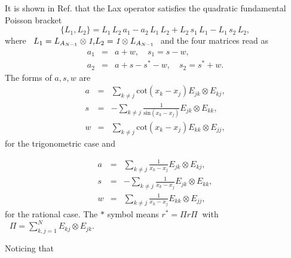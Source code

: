 \documentclass[a4paper,12pt]{article}
\begin{document}
\vspace{1pt}It is shown in Ref. \cite{s1} that the Lax operator satisfies the
quadratic fundamental Poisson bracket
\begin{equation}
\{L_{1},L_{2}\}=L_{1}\,L_{2}\,a_{1}-a_{2}\,L_{1}\,L_{2}+L_{2}\,s_{1}%
\,L_{1}-L_{1}\,s_{2}\,L_{2},  \label{quad}
\end{equation}
where \ $L_{1}=L_{A_{N-1}}\otimes \emph{1,}L_{2}=\emph{1}\otimes L_{A_{N-1}}%
\emph{\ \ }$and the four matrices read as
\begin{eqnarray}
a_{1} &=&a+w,\quad s_{1}=s-w,  \nonumber \\
a_{2} &=&a+s-s^{\ast }-w,\quad s_{2}=s^{\ast }+w.
\end{eqnarray}
The forms of $a,s,w$ are
\begin{eqnarray}
a &=&\sum_{k\neq j}\mathrm{cot}(x_{k}-x_{j})E_{jk}\otimes E_{kj},  \nonumber
\\
s &=&-\sum_{k\neq j}\frac{1}{\mathrm{sin}(x_{k}-x_{j})}E_{jk}\otimes E_{kk},
\nonumber \\
w &=&\sum_{k\neq j}\mathrm{cot}(x_{k}-x_{j})E_{kk}\otimes E_{jj},
\end{eqnarray}
for the trigonometric case and

\begin{eqnarray}
a &=&\sum_{k\neq j}\frac{1}{x_{k}-x_{j}}E_{jk}\otimes E_{kj},  \nonumber \\
s &=&-\sum_{k\neq j}\frac{1}{x_{k}-x_{j}}E_{jk}\otimes E_{kk},	\nonumber \\
w &=&\sum_{k\neq j}\frac{1}{x_{k}-x_{j}}E_{kk}\otimes E_{jj},
\end{eqnarray}
for the rational case. The $\ast $ symbol means $r^{\ast }=\Pi r\Pi \;\;$with$%
\;\;\Pi =\sum_{k,j=1}^{N}E_{kj}\otimes E_{jk}.$

Noticing that
\end{document}
